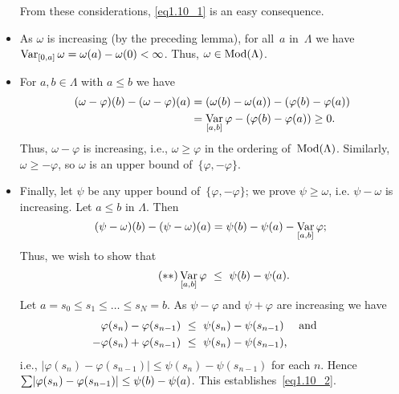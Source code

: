 \documentclass[main.tex]{subfiles}
\begin{document}
\begin{itemize}
From these considerations, \eqref{eq1.10_1} is an easy consequence.
%
\item
As $\omega$ is increasing (by the preceding lemma),
for all~$a$ in~$\Lambda$ 
we have $\mathop{\mathrm{Var}}_{[0,a]}\omega = \omega(a)-\omega(0)<\infty$.
Thus, $\omega\in\mathrm{Mod}(\Lambda)$.
%
\item
For $a,b\in\Lambda$ with $a\leq b$ we have
\begin{align*}
(\omega - \varphi)(b) - (\omega-\varphi)(a)
  & = (\omega(b) - \omega(a)) - (\varphi(b) - \varphi(a)) \\
  & = \mathop{\mathrm{Var}}_{[a,b]}\varphi - (\varphi(b) - \varphi(a)) \ge 0
\textnormal{.}
\end{align*}
Thus, $\omega-\varphi$ is increasing, 
i.e., $\omega\ge \varphi$ in the ordering of~$\mathrm{Mod}(\Lambda)$.
Similarly, $\omega\geq -\varphi$,
so $\omega$ is an upper bound of~$\{ \varphi, -\varphi \}$.
%
\item
Finally, 
let $\psi$ be any upper bound of~$\{\varphi,-\varphi\}$;
we prove $\psi\ge \omega$,
i.e. $\psi-\omega$ is increasing.
Let $a\leq b$ in $\Lambda$.
Then 
\begin{equation*}
(\psi-\omega)(b) - (\psi-\omega)(a)
  = \psi(b) - \psi(a) - \mathop{\mathrm{Var}}_{[a,b]}\varphi
\textnormal{; }
\end{equation*}
Thus, 
we wish to show that
\begin{equation}
\label{eq1.10_2}  \tag{$**$}
\mathop{\mathrm{Var}}_{[a,b]}\varphi \ \leq\  \psi(b)-\psi(a) \textnormal{.}
\end{equation}
Let $a=s_0\leq s_1 \leq \ldots \leq s_N = b$.
As $\psi-\varphi$ and $\psi+\varphi$ are increasing we have
\begin{align*}
\varphi(s_n) - \varphi(s_{n-1})
  &\  \leq\  \psi(s_n) - \psi(s_{n-1}) 
\quad\textnormal{ and }\quad \\
-\varphi(s_n) + \varphi(s_{n-1})
  &\  \leq\  \psi(s_n) - \psi(s_{n-1})
\textnormal{,}
\end{align*}
i.e., 
$|\varphi(s_n) - \varphi(s_{n-1})| 
  \leq \psi(s_n) - \psi(s_{n-1})$ 
for each $n$.
Hence~$\smash{\sum} |\varphi(s_n) - \varphi(s_{n-1})|
  \leq \psi (b) - \psi(a)$.
This establishes~\eqref{eq1.10_2}.
\end{itemize}
\end{document}
